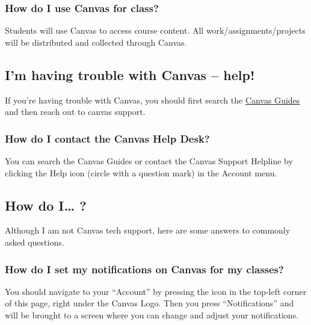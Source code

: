 \hypertarget{how-do-i-use-canvas-for-class}{%
\subsubsection{How do I use Canvas for class?}\label{how-do-i-use-canvas-for-class}}

Students will use Canvas to access course content.
All work/assignments/projects will be distributed and collected through Canvas.

\hypertarget{im-having-trouble-with-canvas-help}{%
\subsection{I'm having trouble with Canvas -- help!}\label{im-having-trouble-with-canvas-help}}

If you're having trouble with Canvas, you should first search the \href{https://community.canvaslms.com/t5/Canvas-Basics-Guide/tkb-p/basics}{Canvas Guides} and then reach out to canvas support.

\hypertarget{how-do-i-contact-the-canvas-help-desk}{%
\subsubsection{How do I contact the Canvas Help Desk?}\label{how-do-i-contact-the-canvas-help-desk}}

You can search the Canvas Guides or contact the Canvas Support Helpline by clicking the Help icon (circle with a question mark) in the Account menu.

\hypertarget{how-do-i}{%
\subsection{How do I\ldots{} ?}\label{how-do-i}}

Although I am not Canvas tech support, here are some answers to commonly asked questions.

\hypertarget{how-do-i-set-my-notifications-on-canvas-for-my-classes}{%
\subsubsection{How do I set my notifications on Canvas for my classes?}\label{how-do-i-set-my-notifications-on-canvas-for-my-classes}}

You should navigate to your ``Account'' by pressing the icon in the top-left corner of this page, right under the Canvas Logo. Then you press ``Notifications'' and will be brought to a screen where you can change and adjust your notifications.

